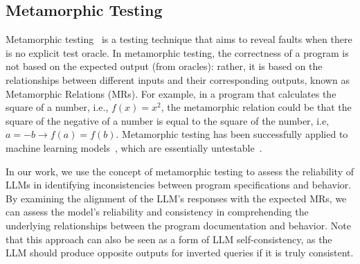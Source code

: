 \subsection{Metamorphic Testing}
Metamorphic testing~\cite{segura2016survey} is a testing technique that aims to reveal faults when there is no explicit test oracle. In metamorphic testing, the correctness of a program is not based on the expected output (from oracles): rather, it is based on the relationships between different inputs and their corresponding outputs, known as Metamorphic Relations (MRs). For example, in a program that calculates the square of a number, i.e., $f(x) = x^2$, the metamorphic relation could be that the square of the negative of a number is equal to the square of the number, i.e, $a = -b \rightarrow f(a) = f(b)$. Metamorphic testing has been successfully applied to machine learning models~\cite{applis2021assessing, murphy2008properties, xie2011testing}, which are essentially untestable~\cite{Weyuker1982aa}.

In our work, we use the concept of metamorphic testing to assess the reliability of LLMs in identifying inconsistencies between program specifications and behavior. 
By examining the alignment of the LLM's responses with the expected MRs, we can assess the model's reliability and consistency in comprehending the underlying relationships between the program documentation and behavior. Note that this approach can also be seen as a form of LLM self-consistency, as the LLM should produce opposite outputs for inverted queries if it is truly consistent.



